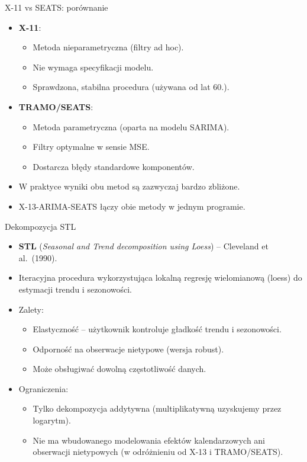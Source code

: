 \documentclass[11pt,usenames,dvipsnames,aspectratio=169]{beamer}
\begin{document}
\begin{frame}{X-11 vs SEATS: porównanie}
\begin{itemize}
    \item \textbf{X-11}:
    \begin{itemize}
        \item Metoda nieparametryczna (filtry ad hoc).
        \item Nie wymaga specyfikacji modelu.
        \item Sprawdzona, stabilna procedura (używana od lat 60.).
    \end{itemize}
    \item \textbf{TRAMO/SEATS}:
    \begin{itemize}
        \item Metoda parametryczna (oparta na modelu SARIMA).
        \item Filtry optymalne w sensie MSE.
        \item Dostarcza błędy standardowe komponentów.
    \end{itemize}
    \item W praktyce wyniki obu metod są zazwyczaj bardzo zbliżone.
    \item X-13-ARIMA-SEATS łączy obie metody w jednym programie.
\end{itemize}
\end{frame}

\begin{frame}{Dekompozycja STL}
\begin{itemize}
    \item \textbf{STL} (\emph{Seasonal and Trend decomposition using Loess}) -- Cleveland et al.\ (1990).
    \item Iteracyjna procedura wykorzystująca lokalną regresję wielomianową (loess) do estymacji trendu i sezonowości.
    \item Zalety:
    \begin{itemize}
        \item Elastyczność -- użytkownik kontroluje gładkość trendu i sezonowości.
        \item Odporność na obserwacje nietypowe (wersja robust).
        \item Może obsługiwać dowolną częstotliwość danych.
    \end{itemize}
    \item Ograniczenia:
    \begin{itemize}
        \item Tylko dekompozycja addytywna (multiplikatywną uzyskujemy przez logarytm).
        \item Nie ma wbudowanego modelowania efektów kalendarzowych ani obserwacji nietypowych (w odróżnieniu od X-13 i TRAMO/SEATS).
    \end{itemize}
\end{itemize}
\end{frame}
\end{document}
